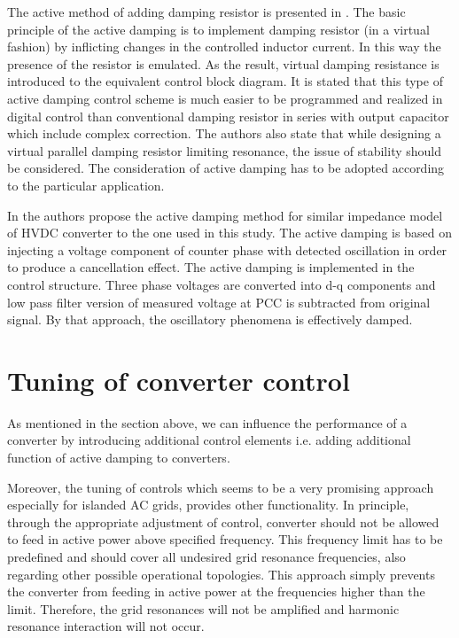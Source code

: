 \documentclass[a4paper,11pt,twoside,openright]{report}
\begin{document}
The active method of adding damping resistor is presented in \cite{chen2012}. The basic principle of the active damping is to implement damping resistor (in a virtual fashion) by inflicting changes in the controlled inductor current. In this way the presence of the resistor is emulated. As the result, virtual damping resistance is introduced  to the equivalent control block diagram. It is stated that this type of active damping control scheme is much easier to be programmed and realized in digital control than conventional damping resistor in series with output capacitor which include complex correction. The authors also state that while designing a virtual parallel damping resistor limiting resonance, the issue of stability should be considered. The consideration of active damping has to be adopted according to the particular application.

In \cite{amin2015} the authors propose the active damping method for similar impedance model of HVDC converter to the one used in this study. The active damping \cite{amin2015} is based on injecting a voltage component of counter phase with detected oscillation in order to produce a cancellation effect. The active damping is implemented in the control structure. Three phase voltages are converted into d-q components and low pass filter version of measured voltage at PCC is subtracted from original signal. By that approach, the oscillatory phenomena is effectively damped.

\section{Tuning of converter control}
As mentioned in the section above, we can influence the performance of a converter by introducing additional control elements i.e. adding additional function of active damping to converters.

Moreover, the tuning of controls which seems to be a very promising approach especially for islanded AC grids, provides other functionality. In principle, through the appropriate adjustment of control, converter should not be allowed to feed in active power above specified frequency. This frequency limit has to be predefined and should cover all undesired grid resonance frequencies, also regarding other possible operational topologies. This approach simply prevents the converter from feeding in active power at the frequencies higher than the limit. Therefore, the grid resonances will not be amplified and harmonic resonance interaction will not occur.
\end{document}
